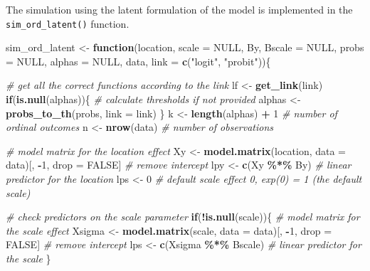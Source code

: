 \documentclass[
  man,floatsintext]{apa6}
\newenvironment{Shaded}{\begin{snugshade}}{\end{snugshade}}
\newcommand{\AttributeTok}[1]{\textcolor[rgb]{0.13,0.29,0.53}{#1}}
\newcommand{\CommentTok}[1]{\textcolor[rgb]{0.56,0.35,0.01}{\textit{#1}}}
\newcommand{\ConstantTok}[1]{\textcolor[rgb]{0.56,0.35,0.01}{#1}}
\newcommand{\ControlFlowTok}[1]{\textcolor[rgb]{0.13,0.29,0.53}{\textbf{#1}}}
\newcommand{\DecValTok}[1]{\textcolor[rgb]{0.00,0.00,0.81}{#1}}
\newcommand{\FunctionTok}[1]{\textcolor[rgb]{0.13,0.29,0.53}{\textbf{#1}}}
\newcommand{\NormalTok}[1]{#1}
\newcommand{\OtherTok}[1]{\textcolor[rgb]{0.56,0.35,0.01}{#1}}
\newcommand{\SpecialCharTok}[1]{\textcolor[rgb]{0.81,0.36,0.00}{\textbf{#1}}}
\newcommand{\StringTok}[1]{\textcolor[rgb]{0.31,0.60,0.02}{#1}}
\begin{document}
The simulation using the latent formulation of the model is implemented in the \texttt{sim\_ord\_latent()} function.

\begin{Shaded}
\begin{Highlighting}[]
\NormalTok{sim\_ord\_latent }\OtherTok{\textless{}{-}} \ControlFlowTok{function}\NormalTok{(location,}
                           \AttributeTok{scale =} \ConstantTok{NULL}\NormalTok{,}
\NormalTok{                           By,}
                           \AttributeTok{Bscale =} \ConstantTok{NULL}\NormalTok{,}
                           \AttributeTok{probs =} \ConstantTok{NULL}\NormalTok{, }
                           \AttributeTok{alphas =} \ConstantTok{NULL}\NormalTok{, }
\NormalTok{                           data, }
                           \AttributeTok{link =} \FunctionTok{c}\NormalTok{(}\StringTok{"logit"}\NormalTok{, }\StringTok{"probit"}\NormalTok{))\{}
  
  \CommentTok{\# get all the correct functions according to the link}
\NormalTok{  lf }\OtherTok{\textless{}{-}} \FunctionTok{get\_link}\NormalTok{(link)}
  \ControlFlowTok{if}\NormalTok{(}\FunctionTok{is.null}\NormalTok{(alphas))\{}
    \CommentTok{\# calculate thresholds if not provided}
\NormalTok{    alphas }\OtherTok{\textless{}{-}} \FunctionTok{probs\_to\_th}\NormalTok{(probs, }\AttributeTok{link =}\NormalTok{ link)}
\NormalTok{  \}}
\NormalTok{  k }\OtherTok{\textless{}{-}} \FunctionTok{length}\NormalTok{(alphas) }\SpecialCharTok{+} \DecValTok{1} \CommentTok{\# number of ordinal outcomes}
\NormalTok{  n }\OtherTok{\textless{}{-}} \FunctionTok{nrow}\NormalTok{(data) }\CommentTok{\# number of observations}
  
  \CommentTok{\# model matrix for the location effect}
\NormalTok{  Xy }\OtherTok{\textless{}{-}} \FunctionTok{model.matrix}\NormalTok{(location, }\AttributeTok{data =}\NormalTok{ data)[, }\SpecialCharTok{{-}}\DecValTok{1}\NormalTok{, drop }\OtherTok{=} \ConstantTok{FALSE}\NormalTok{] }\CommentTok{\# remove intercept}
\NormalTok{  lpy }\OtherTok{\textless{}{-}} \FunctionTok{c}\NormalTok{(Xy }\SpecialCharTok{\%*\%}\NormalTok{ By) }\CommentTok{\# linear predictor for the location}
\NormalTok{  lps }\OtherTok{\textless{}{-}} \DecValTok{0} \CommentTok{\# default scale effect 0, exp(0) = 1 (the default scale)}
  
  \CommentTok{\# check predictors on the scale parameter}
  \ControlFlowTok{if}\NormalTok{(}\SpecialCharTok{!}\FunctionTok{is.null}\NormalTok{(scale))\{}
    \CommentTok{\# model matrix for the scale effect}
\NormalTok{    Xsigma }\OtherTok{\textless{}{-}} \FunctionTok{model.matrix}\NormalTok{(scale, }\AttributeTok{data =}\NormalTok{ data)[, }\SpecialCharTok{{-}}\DecValTok{1}\NormalTok{, drop }\OtherTok{=} \ConstantTok{FALSE}\NormalTok{] }\CommentTok{\# remove intercept}
\NormalTok{    lps }\OtherTok{\textless{}{-}} \FunctionTok{c}\NormalTok{(Xsigma }\SpecialCharTok{\%*\%}\NormalTok{ Bscale) }\CommentTok{\# linear predictor for the scale}
\NormalTok{  \}}
  

\end{Highlighting}
\end{Shaded}
\end{document}
